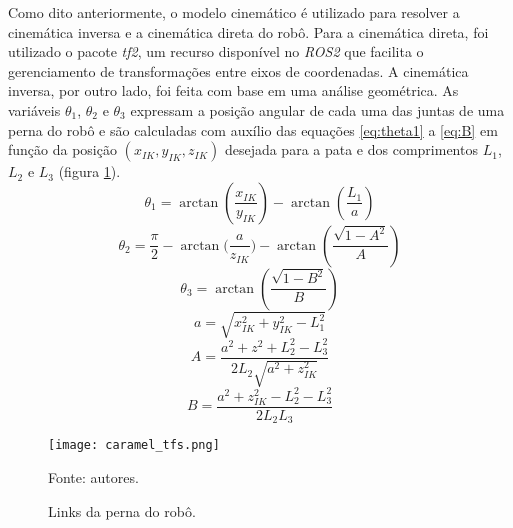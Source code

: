 \documentclass[conference]{IEEEtran}
\begin{document}
Como dito anteriormente, o modelo cinemático é utilizado para resolver a cinemática inversa e a cinemática direta do robô. Para a cinemática direta, foi utilizado o pacote \textit{tf2}, um recurso disponível no \textit{ROS2} que facilita o gerenciamento de transformações entre eixos de coordenadas. A cinemática inversa, por outro lado, foi feita com base em uma análise geométrica. As variáveis $\theta_1$, $\theta_2$ e $\theta_3$ expressam a posição angular de cada uma das juntas de uma perna do robô e são calculadas com auxílio das equações \ref{eq:theta1} a \ref{eq:B} em função da posição $(x_{IK}, y_{IK}, z_{IK})$ desejada para a pata e dos comprimentos $L_1$, $L_2$ e $L_3$ (figura \ref{fig:caramel_tfs}).
\begin{equation}
  \label{eq:theta1}
  \theta_1 = \arctan{(\frac{x_{IK}}{y_{IK}})} - \arctan{(\frac{L_1}{a})}
\end{equation}
\begin{equation}
  \label{eq:theta2}
  \theta_2 = \frac{\pi}{2} - \arctan{(\frac{a}{z_{IK}}}) - \arctan{(\frac{\sqrt{1-A^2}}{A})}
\end{equation}
\begin{equation}
  \label{eq:theta3}
  \theta_3 = \arctan(\frac{\sqrt{1-B^2}}{B})
\end{equation}
\begin{equation}
  \label{eq:a}
  a = \sqrt{x_{IK}^2+y_{IK}^2-L_1^2}
\end{equation}
\begin{equation}
  \label{eq:A}
  A =\frac{a^2+z^2+L_2^2-L_3^2}{2L_2\sqrt{a^2+z_{IK}^2}}
\end{equation}
\begin{equation}
  \label{eq:B}
  B = \frac{a^2+z_{IK}^2-L_2^2-L_3^2}{2L_2L_3}
\end{equation}

\begin{figure}[htbp]
  \centering
  \texttt{[image: caramel\_tfs.png]}
  
  \caption{Links da perna do robô.}
  Fonte: autores.
  \label{fig:caramel_tfs}
\end{figure}
\end{document}
